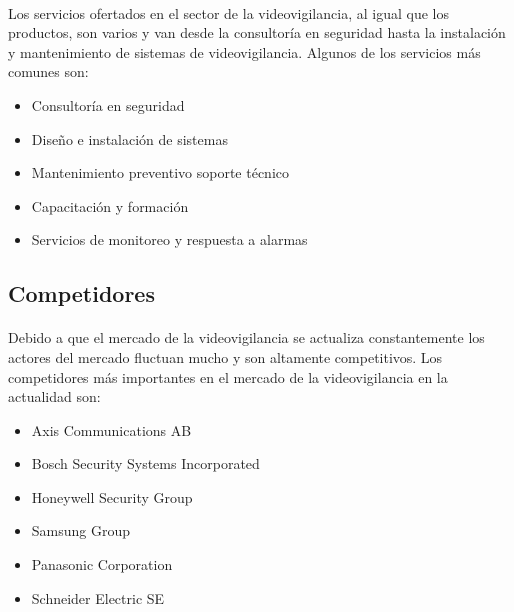 \documentclass{report}
\begin{document}
          \paragraph*{}
          {
            Los servicios ofertados en el sector de la videovigilancia, al igual que los productos, son varios y van desde la consultoría en seguridad hasta la instalación y mantenimiento de sistemas de videovigilancia. 
            Algunos de los servicios más comunes son: \cite{wiki-videovigilancia-ip}
          }
          \begin{itemize}
            \item Consultoría en seguridad
            \item Diseño e instalación de sistemas
            \item Mantenimiento preventivo soporte técnico
            \item Capacitación y formación
            \item Servicios de monitoreo y respuesta a alarmas
          \end{itemize}
        \subsection{Competidores}
          \paragraph*{}{Debido a que el mercado de la videovigilancia se actualiza constantemente los actores del mercado fluctuan mucho y son altamente competitivos. Los competidores más importantes en el mercado de la videovigilancia en la actualidad son:}
          \begin{multicols}{3}
            \begin{itemize}
              \item Axis Communications AB
              \item Bosch Security Systems Incorporated
              \item Honeywell Security Group
              \item Samsung Group
              \item Panasonic Corporation
              \item Schneider Electric SE
            \end{itemize}
          \end{multicols}
\end{document}
